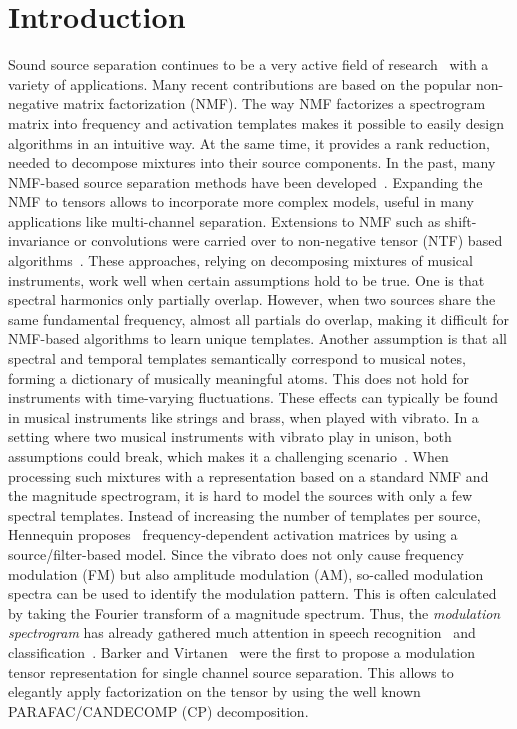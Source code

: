 \vspace{-0.2em}
\section{Introduction}
\label{sec:intro}
Sound source separation continues to be a very active field of research~\cite{vincent14} with a variety of applications. Many recent contributions are based on the popular non-negative matrix factorization (NMF). The way NMF factorizes a spectrogram matrix into frequency and activation templates makes it possible to easily design algorithms in an intuitive way. At the same time, it provides a rank reduction, needed to decompose mixtures into their source components.
In the past, many NMF-based source separation methods have been developed~\cite{smaragdis03, smaragdis04, virtanen2007monaural}. Expanding the NMF to tensors allows to incorporate more complex models, useful in many applications like multi-channel separation. Extensions to NMF such as shift-invariance or convolutions were carried over to non-negative tensor (NTF) based algorithms~\cite{fitzgerald05, fitzgerald08, fitzgerald06, fevotte10, ozerov11}. These approaches, relying on decomposing mixtures of musical instruments, work well when certain assumptions hold to be true.
One is that spectral harmonics only partially overlap. However, when two sources share the same fundamental frequency, almost all partials do overlap, making it difficult for NMF-based algorithms to learn unique templates. Another assumption is that all spectral and temporal templates semantically correspond to musical notes, forming a dictionary of musically meaningful atoms.
This does not hold for instruments with time-varying fluctuations. These effects can typically be found in musical instruments like strings and brass, when played with vibrato. In a setting where two musical instruments with vibrato play in unison, both assumptions could break, which makes it a challenging scenario~\cite{stoeter14}.
When processing such mixtures with a representation based on a standard NMF and the magnitude spectrogram, it is hard to model the sources with only a few spectral templates. Instead of increasing the number of templates per source, Hennequin proposes~\cite{hennequin2011nmf} frequency-dependent activation matrices by using a source/filter-based model.
Since the vibrato does not only cause frequency modulation (FM) but also amplitude modulation (AM), so-called modulation spectra can be used to identify the modulation pattern. This is often calculated by taking the Fourier transform of a magnitude spectrum. Thus, the \emph{modulation spectrogram} has already gathered much attention in speech recognition~\cite{greenberg97,kingsbury98} and  classification~\cite{kinnunen08,markaki09}.
Barker and Virtanen~\cite{barker13} were the first to propose a modulation tensor representation for single channel source separation. This allows to elegantly apply factorization on the tensor by using the well known PARAFAC/CANDECOMP (CP) decomposition.

